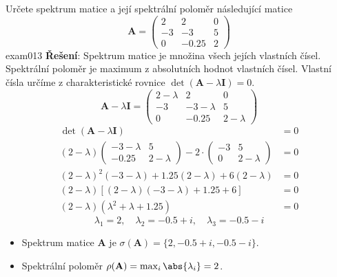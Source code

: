 \begin{mathexam}{Určete spektrum matice a její spektrální poloměr následující matice
  \begin{equation*}\label{pr:spektrum_matice}
    \mathbf{A} =
      \begin{pmatrix}
        2  &        2    & 0 \\
       -3  &       -3    & 5 \\
        0  & -\num{0.25} & 2
      \end{pmatrix}
  \end{equation*}
  }{exam013} 
  \textbf{Řešení}: Spektrum matice je množina všech jejích vlastních čísel. Spektrální poloměr je
  maximum z absolutních hodnot vlastních čísel. Vlastní čísla určíme z charakteristické rovnice
  \(\det(\mathbf{A}-\lambda \mathbf{I})=0\).
      \begin{equation*}
        \textbf{A} - \lambda\textbf{I}=
          \begin{pmatrix}
            2-\lambda  &  2          & 0 \\
           -3          & -3-\lambda  & 5 \\
            0          & -0.25       & 2-\lambda
        \end{pmatrix}
      \end{equation*}
      \begin{align}
        \det(\mathbf{A}-\lambda \mathbf{I})                    &= 0           \nonumber\\
        (2-\lambda)
          \begin{pmatrix}
            -3-\lambda  &  5\\
              -0.25    &  2 - \lambda
          \end{pmatrix} -2\cdot
          \begin{pmatrix}
            -3       &  5\\
            0       &  2 - \lambda
          \end{pmatrix}                                        &= 0           \nonumber\\
        (2-\lambda)^2(-3-\lambda)+1.25(2-\lambda)+6(2-\lambda) &= 0           \nonumber\\
        (2-\lambda)[(2-\lambda)(-3-\lambda)+1.25+6]            &= 0           \nonumber\\
        (2-\lambda)(\lambda^2+\lambda+1.25)                    &= 0           \nonumber
      \end{align}
      \begin{equation*}
        \lambda_1 = 2, \quad\lambda_2 = -0.5+i, \quad\lambda_3=-0.5-i
      \end{equation*}
      \begin{itemize}
        \item Spektrum matice \(\mathbf{A}\) je \(\sigma(\mathbf{A})=\{2,-0.5+i,-0.5-i\}\).
        \item Spektrální poloměr \(\rho(\mathbf{A})=\max_i\abs{\lambda_i}=2\).
      \end{itemize}

\end{mathexam}